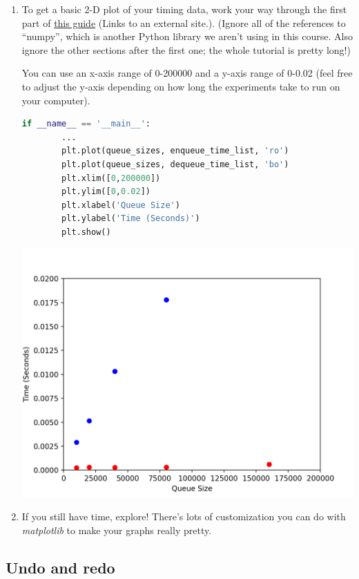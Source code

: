 \documentclass[12pt]{article}
\begin{document}
\begin{enumerate}[1.]
\begin{mdframed}
    \end{mdframed}

    \item To get a basic 2-D plot of your timing data, work your way through the
    first part of \href{https://matplotlib.org/users/pyplot_tutorial.html}{this guide} (Links to an external site.). (Ignore all of the
    references to “numpy”, which is another Python library we aren’t using in this
    course. Also ignore the other sections after the first one; the whole tutorial
    is pretty long!)

    \bigskip

    You can use an x-axis range of 0-200000 and a y-axis range of 0-0.02 (feel
    free to adjust the y-axis depending on how long the experiments take to run
    on your computer).

    \bigskip

    \begin{mdframed}

    \begin{lstlisting}[language=Python,caption={task\_4\_q1\_part\_3\_solution.py},captionpos=b]
    if __name__ == '__main__':
        ...
        plt.plot(queue_sizes, enqueue_time_list, 'ro')
        plt.plot(queue_sizes, dequeue_time_list, 'bo')
        plt.xlim([0,200000])
        plt.ylim([0,0.02])
        plt.xlabel('Queue Size')
        plt.ylabel('Time (Seconds)')
        plt.show()
    \end{lstlisting}

    \begin{center}
    \includegraphics[width=0.8 \linewidth]{../../images/lab4_t4_q1_part3_solution.png}
    \end{center}

    \end{mdframed}

    \item If you still have time, explore! There’s lots of customization you can
    do with \textit{matplotlib} to make your graphs really pretty.
\end{enumerate}

\subsection*{Undo and redo}
\end{document}
